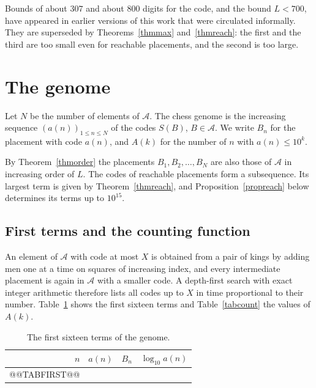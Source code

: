 \documentclass[12pt,reqno]{article}
\newcommand{\adm}{\mathcal{A}}
\begin{document}
\begin{remark}
Bounds of about $307$ and about $800$ digits for the code, and the bound $L<700$, have
appeared in earlier versions of this work that were circulated informally. They are superseded
by Theorems~\ref{thmmax} and~\ref{thmreach}: the first and the third are too small even for
reachable placements, and the second is too large.
\end{remark}

\section{The genome}\label{secgenome}

\begin{definition}
Let $N$ be the number of elements of $\adm$. The chess genome is the increasing
sequence $(a(n))_{1\leq n\leq N}$ of the codes $S(B)$, $B\in\adm$. We write $B_n$ for the
placement with code $a(n)$, and $A(k)$ for the number of $n$ with $a(n)\leq 10^k$.
\end{definition}

By Theorem~\ref{thmorder} the placements $B_1,B_2,\ldots,B_N$ are also those of $\adm$ in
increasing order of $L$. The codes of reachable placements form a subsequence. Its largest term is
given by Theorem~\ref{thmreach}, and Proposition~\ref{propreach} below determines its terms up
to $10^{15}$.

\subsection{First terms and the counting function}

An element of $\adm$ with code at most $X$ is obtained from a pair of kings by adding men one
at a time on squares of increasing index, and every intermediate placement is again in $\adm$
with a smaller code. A depth-first search with exact integer arithmetic therefore lists all codes
up to $X$ in time proportional to their number. Table~\ref{tabfirst} shows the first sixteen terms
and Table~\ref{tabcount} the values of $A(k)$.

\begin{table}[H]
\begin{center}
\begin{tabular}{r|r|l|c}
$n$ & $a(n)$ & $B_n$ & $\log_{10}a(n)$\\ \hline
@@TABFIRST@@
\end{tabular}
\end{center}
\caption{The first sixteen terms of the genome.}
\label{tabfirst}
\end{table}
\end{document}
